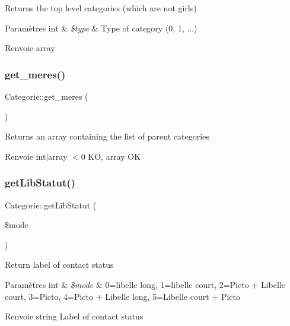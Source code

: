 Returns the top level categories (which are not girls)


\begin{DoxyParams}[1]{Paramètres}
int & {\em \$type} & Type of category (0, 1, ...) \\
\hline
\end{DoxyParams}
\begin{DoxyReturn}{Renvoie}
array 
\end{DoxyReturn}
\mbox{\label{classCategorie_ab564dd2c08c0435dca64bb6488103475}} 
\subsubsection{\texorpdfstring{get\+\_\+meres()}{get\_meres()}}
{\footnotesize\ttfamily Categorie\+::get\+\_\+meres (\begin{DoxyParamCaption}{ }\end{DoxyParamCaption})}

Returns an array containing the list of parent categories

\begin{DoxyReturn}{Renvoie}
int$\vert$array $<$0 KO, array OK 
\end{DoxyReturn}
\mbox{\label{classCategorie_a2d0a5aece806773cc0450b1815a585ff}} 
\subsubsection{\texorpdfstring{get\+Lib\+Statut()}{getLibStatut()}}
{\footnotesize\ttfamily Categorie\+::get\+Lib\+Statut (\begin{DoxyParamCaption}\item[{}]{\$mode }\end{DoxyParamCaption})}

Return label of contact status


\begin{DoxyParams}[1]{Paramètres}
int & {\em \$mode} & 0=libelle long, 1=libelle court, 2=Picto + Libelle court, 3=Picto, 4=Picto + Libelle long, 5=Libelle court + Picto \\
\hline
\end{DoxyParams}
\begin{DoxyReturn}{Renvoie}
string Label of contact status 
\end{DoxyReturn}
\mbox{\label{classCategorie_a0f8958a784bddf8c077c33ba15978eb8}} 
